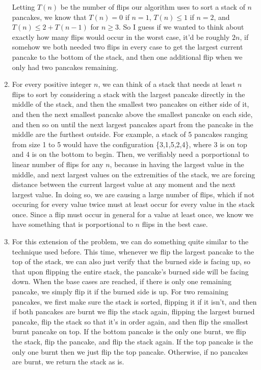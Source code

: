 \documentclass{article}
\begin{document}
\begin{enumerate}[a]
	Letting $T(n)$ be the number of flips our algorithm uses to sort a stack of $n$ pancakes, we know that
		$T(n) = 0$ if $n=1$, $T(n)\leq1$ if $n=2$, and $T(n)\leq 2+ T(n-1)$ for $n \geq 3$. So I guess if
		we wanted to think about exactly how many flips would occur in the worst case, it'd be roughly 
		$2n$, if somehow we both needed two flips in every case to get the largest current pancake to the 
		bottom of the stack, and then one additional flip when we only had two pancakes remaining.
\item For every positive integer $n$, we can think of a stack that needs at least $n$ flips to sort by considering
	a stack with the largest pancake directly in the middle of the stack, and then the smallest two pancakes on 
		either side of it, and then the next smallest pancake above the smallest pancake on each side, and
		then so on until the next largest pancakes apart from the pancake in the middle are the furthest
		outside. For example, a stack of 5 pancakes ranging from size 1 to 5 would have the configuration
		\{3,1,5,2,4\}, where 3 is on top and 4 is on the bottom to begin. Then, we verifiably need a 
		porportional to linear number of flips for any $n$, because in having the largest value in the
		middle, and next largest values on the extremities of the stack, we are forcing distance between
		the current largest value at any moment and the next largest value. In doing so, we are causing
		a large number of flips, which if not occuring for every value twice must at least occur for every
		value in the stack once. Since a flip must occur in general for a value at least once, we know we
		have something that is porportional to $n$ flips in the best case.
	\item For this extension of the problem, we can do something quite similar to the technique used before.
		This time, whenever we flip the largest pancake to the top of the stack, we can also just verify
		that the burned side is facing up, so that upon flipping the entire stack, the pancake's burned side
		will be facing down.
		When the base cases are reached, if there is only one remaining pancake, we simply flip it if the
		burned side is up. For two remaining pancakes, we first make sure the stack is sorted, flipping it if it isn't,
		and then if both pancakes are burnt we flip the stack again, flipping the largest burned pancake, flip the stack
		so that it's in order again, and then flip the smallest burnt pancake on top. If the bottom pancake is the only
		one burnt, we flip the stack, flip the pancake, and flip the stack again. If the top pancake is the only one burnt
		then we just flip the top pancake. Otherwise, if no pancakes are burnt, we return the stack as is.


\end{enumerate}
\end{document}

